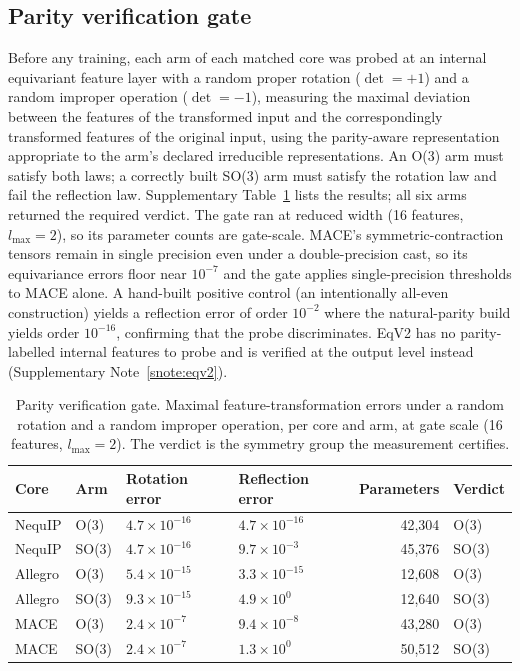 \subsection*{Parity verification gate}

Before any training, each arm of each matched core was probed at an internal equivariant feature layer with a random proper rotation ($\det = +1$) and a random improper operation ($\det = -1$), measuring the maximal deviation between the features of the transformed input and the correspondingly transformed features of the original input, using the parity-aware representation appropriate to the arm's declared irreducible representations. An O(3) arm must satisfy both laws; a correctly built SO(3) arm must satisfy the rotation law and fail the reflection law. Supplementary Table~\ref{stab:gate} lists the results; all six arms returned the required verdict. The gate ran at reduced width (16 features, $l_{\max}=2$), so its parameter counts are gate-scale. MACE's symmetric-contraction tensors remain in single precision even under a double-precision cast, so its equivariance errors floor near $10^{-7}$ and the gate applies single-precision thresholds to MACE alone. A hand-built positive control (an intentionally all-even construction) yields a reflection error of order $10^{-2}$ where the natural-parity build yields order $10^{-16}$, confirming that the probe discriminates. EqV2 has no parity-labelled internal features to probe and is verified at the output level instead (Supplementary Note~\ref{snote:eqv2}).

\begin{table}[htbp]
\centering
\caption{Parity verification gate. Maximal feature-transformation errors under a random rotation and a random improper operation, per core and arm, at gate scale (16 features, $l_{\max}=2$). The verdict is the symmetry group the measurement certifies.}
\label{stab:gate}
\scriptsize
\begin{tabular*}{\textwidth}{@{\extracolsep{\fill}}llllrl}
\toprule
Core & Arm & Rotation error & Reflection error & Parameters & Verdict \\
\midrule
NequIP & O(3) & $4.7\times10^{-16}$ & $4.7\times10^{-16}$ & 42{,}304 & O(3) \\
NequIP & SO(3) & $4.7\times10^{-16}$ & $9.7\times10^{-3}$ & 45{,}376 & SO(3) \\
Allegro & O(3) & $5.4\times10^{-15}$ & $3.3\times10^{-15}$ & 12{,}608 & O(3) \\
Allegro & SO(3) & $9.3\times10^{-15}$ & $4.9\times10^{0}$ & 12{,}640 & SO(3) \\
MACE & O(3) & $2.4\times10^{-7}$ & $9.4\times10^{-8}$ & 43{,}280 & O(3) \\
MACE & SO(3) & $2.4\times10^{-7}$ & $1.3\times10^{0}$ & 50{,}512 & SO(3) \\
\bottomrule
\end{tabular*}
\end{table}

